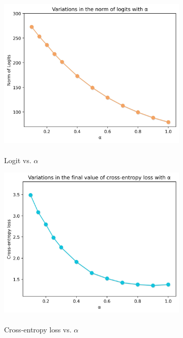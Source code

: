 \documentclass[times,sort&compress]{elsarticle}
\begin{document}
\begin{figure}[t]
\centering
\begin{subfigure}{.33\columnwidth}
\centering
\includegraphics[width=0.96\columnwidth]{logit_vs_alpha}
\caption{\\Logit vs. $\alpha$}
\end{subfigure}%
\begin{subfigure}{.33\columnwidth}
\centering
\includegraphics[width=0.96\columnwidth]{loss_vs_alpha}
\caption{\\Cross-entropy loss vs. $\alpha$}
\end{subfigure}%
\begin{subfigure}{.33\columnwidth}
\centering

\end{subfigure}
\end{figure}
\end{document}
